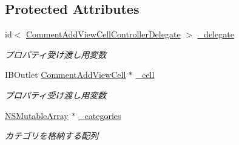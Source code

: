 \subsection*{Protected Attributes}
\begin{DoxyCompactItemize}
\item 
\hypertarget{interface_comment_add_view_cell_controller_a3e6da360df77b6f0d4b9985623472391}{
id$<$ \hyperlink{protocol_comment_add_view_cell_controller_delegate-p}{CommentAddViewCellControllerDelegate} $>$ \hyperlink{interface_comment_add_view_cell_controller_a3e6da360df77b6f0d4b9985623472391}{\_\-delegate}}
\label{interface_comment_add_view_cell_controller_a3e6da360df77b6f0d4b9985623472391}

\begin{DoxyCompactList}\small\item\em プロパティ受け渡し用変数 \end{DoxyCompactList}\item 
\hypertarget{interface_comment_add_view_cell_controller_aea5e16eb45eda0dc4c40f0bb1d28bf21}{
IBOutlet \hyperlink{interface_comment_add_view_cell}{CommentAddViewCell} $\ast$ \hyperlink{interface_comment_add_view_cell_controller_aea5e16eb45eda0dc4c40f0bb1d28bf21}{\_\-cell}}
\label{interface_comment_add_view_cell_controller_aea5e16eb45eda0dc4c40f0bb1d28bf21}

\begin{DoxyCompactList}\small\item\em プロパティ受け渡し用変数 \end{DoxyCompactList}\item 
\hypertarget{interface_comment_add_view_cell_controller_afca103f5e89b63e6c52a3646e3b07508}{
\hyperlink{class_n_s_mutable_array}{NSMutableArray} $\ast$ \hyperlink{interface_comment_add_view_cell_controller_afca103f5e89b63e6c52a3646e3b07508}{\_\-categories}}
\label{interface_comment_add_view_cell_controller_afca103f5e89b63e6c52a3646e3b07508}

\begin{DoxyCompactList}\small\item\em カテゴリを格納する配列 \end{DoxyCompactList}\end{DoxyCompactItemize}
